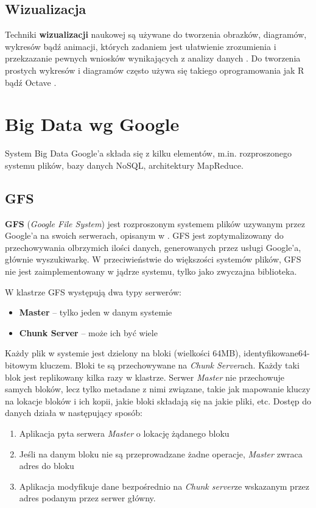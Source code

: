 \documentclass[10pt,twocolumn]{llncs}          %
\begin{document}
\subsection{Wizualizacja}
\label{sub:wizualizacja}
Techniki \textbf{wizualizacji} naukowej są używane do tworzenia obrazków, diagramów, wykresów bądź animacji, których zadaniem jest ułatwienie zrozumienia i przekzazanie pewnych wniosków wynikających z analizy danych \cite{lawrence1994}. Do tworzenia prostych wykresów i diagramów często używa się takiego oprogramowania jak R \cite{www:R} bądź Octave \cite{www:octave}.

\section{Big Data wg Google}
\label{ssub:google}
System Big Data Google'a składa się z kilku elementów, m.in. rozproszonego systemu plików, bazy danych NoSQL, architektury MapReduce.

\subsection{GFS}
\label{ssub:gfs}
\textbf{GFS} (\textit{Google File System}) jest rozproszonym systemem plików uzywanym przez Google'a na swoich serwerach, opisanym w \cite{ghemawat03}. GFS jest zoptymalizowany do przechowywania olbrzymich ilości danych, generowanych przez usługi Google'a, głównie wyszukiwarkę. W przeciwieństwie do większości systemów plików, GFS nie jest zaimplementowany w jądrze systemu, tylko jako zwyczajna biblioteka.

W klastrze GFS występują dwa typy serwerów:
\begin{itemize}
    \item \textbf{Master} -- tylko jeden w danym systemie
    \item \textbf{Chunk Server} -- może ich być wiele
\end{itemize}
Każdy plik w systemie jest dzielony na bloki (wielkości 64MB), identyfikowane64-bitowym kluczem. Bloki te są przechowywane na \textit{Chunk Server}ach. Każdy taki blok jest replikowany kilka razy w klastrze.
Serwer \textit{Master} nie przechowuje samych bloków, lecz tylko metadane z nimi związane, takie jak mapowanie kluczy na lokacje bloków i ich kopii, jakie bloki składają się na jakie pliki, etc.
Dostęp do danych działa w następujący sposób:
\begin{enumerate}
    \item Aplikacja pyta serwera \textit{Master} o lokację żądanego bloku
    \item Jeśli na danym bloku nie są przeprowadzane żadne operacje, \textit{Master} zwraca adres do bloku
    \item Aplikacja modyfikuje dane bezpośrednio na \textit{Chunk server}ze wskazanym przez adres podanym przez serwer główny.
\end{enumerate}
\end{document}
